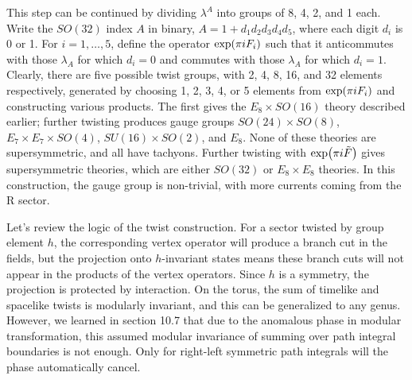 This step can be continued by dividing $\lambda^{A}$ into groups of 8, 4, 2, and 1 each. Write the $SO(32)$ index $A$ in binary, $A=1+d_{1}d_{2}d_{3}d_{4}d_{5}$, where each digit $d_{i}$ is 0 or 1. For $i=1,\ldots,5$, define the operator $\exp(\pi i F_{i})$ such that it anticommutes with those $\lambda_{A}$ for which $d_{i}=0$ and commutes with those $\lambda_{A}$ for which $d_{i}=1$. Clearly, there are five possible twist groups, with 2, 4, 8, 16, and 32 elements respectively, generated by choosing 1, 2, 3, 4, or 5 elements from $\exp(\pi i F_{i})$ and constructing various products. The first gives the $E_{8}\times SO(16)$ theory described earlier; further twisting produces gauge groups $SO(24)\times SO(8)$, $E_{7}\times E_{7}\times SO(4)$, $SU(16)\times SO(2)$, and $E_{8}$. None of these theories are supersymmetric, and all have tachyons. Further twisting with $\exp(\pi i\tilde{F})$ gives supersymmetric theories, which are either $SO(32)$ or $E_{8}\times E_{8}$ theories. In this construction, the gauge group is non-trivial, with more currents coming from the R sector.

Let's review the logic of the twist construction. For a sector twisted by group element $h$, the corresponding vertex operator will produce a branch cut in the fields, but the projection onto $h$-invariant states means these branch cuts will not appear in the products of the vertex operators. Since $h$ is a symmetry, the projection is protected by interaction. On the torus, the sum of timelike and spacelike twists is modularly invariant, and this can be generalized to any genus. However, we learned in section 10.7 that due to the anomalous phase in modular transformation, this assumed modular invariance of summing over path integral boundaries is not enough. Only for right-left symmetric path integrals will the phase automatically cancel.

